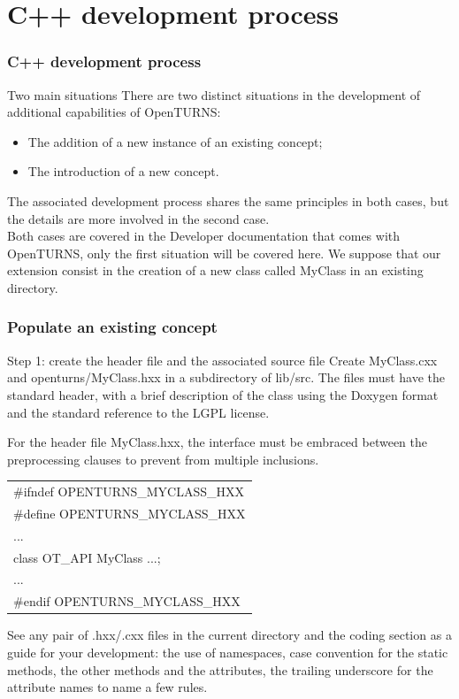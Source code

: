 \documentclass[8pt]{beamer}
\begin{document}
\section[C++ development process]{C++ development process}
\begin{frame}
  \frametitle{C++ development process}
  \begin{block}{Two main situations}
    There are two distinct situations in the development of additional capabilities of OpenTURNS:
    \begin{itemize}
      \item The addition of a new instance of an existing concept;
      \item The introduction of a new concept.
    \end{itemize}
    The associated development process shares the same principles in both cases, but the details are more involved in the second case.\\
    Both cases are covered in the \alert{Developer} documentation that comes with OpenTURNS, only the first situation will be covered here. We suppose that our extension consist in the creation of a new class called MyClass in an existing directory.
  \end{block}
\end{frame}
\begin{frame}
  \frametitle{Populate an existing concept}
  \begin{block}{Step 1: create the header file and the associated source file}
    Create MyClass.cxx and openturns/MyClass.hxx in a subdirectory of lib/src. The files must have the standard header, with a brief description of the class using the Doxygen format and the standard reference to the LGPL license.
  
  For the header file MyClass.hxx, the interface must be embraced between the preprocessing clauses to prevent from multiple inclusions.
  
\begin{tabular}{l}
\ttfamily \#ifndef OPENTURNS\_MYCLASS\_HXX\\
\ttfamily \#define OPENTURNS\_MYCLASS\_HXX\\
\ttfamily ...\\
\ttfamily class OT\_API MyClass {...};\\
\ttfamily ...\\
\ttfamily \#endif OPENTURNS\_MYCLASS\_HXX
\end{tabular}

  See any pair of .hxx/.cxx files in the current directory and the coding section as a guide for your development: the use of namespaces, case convention for the static methods, the other methods and the attributes, the trailing underscore for the attribute names to name a few rules.
  \end{block}
\end{frame}
\end{document}
